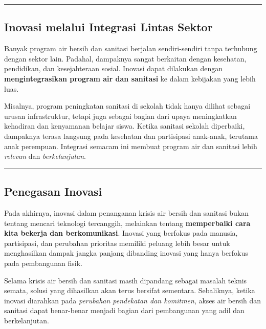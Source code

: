 \documentclass[
  letterpaper,
  DIV=11,
  numbers=noendperiod]{scrreprt}
\begin{document}
\begin{center}\rule{0.5\linewidth}{0.5pt}\end{center}

\subsection{Inovasi melalui Integrasi Lintas
Sektor}\label{inovasi-melalui-integrasi-lintas-sektor}

Banyak program air bersih dan sanitasi berjalan sendiri-sendiri tanpa
terhubung dengan sektor lain. Padahal, dampaknya sangat berkaitan dengan
kesehatan, pendidikan, dan kesejahteraan sosial. Inovasi dapat dilakukan
dengan \textbf{mengintegrasikan program air dan sanitasi} ke dalam
kebijakan yang lebih luas.

Misalnya, program peningkatan sanitasi di sekolah tidak hanya dilihat
sebagai urusan infrastruktur, tetapi juga sebagai bagian dari upaya
meningkatkan kehadiran dan kenyamanan belajar siswa. Ketika sanitasi
sekolah diperbaiki, dampaknya terasa langsung pada kesehatan dan
partisipasi anak-anak, terutama anak perempuan. Integrasi semacam ini
membuat program air dan sanitasi lebih \emph{relevan} dan
\emph{berkelanjutan}.

\begin{center}\rule{0.5\linewidth}{0.5pt}\end{center}

\subsection{Penegasan Inovasi}\label{penegasan-inovasi}

Pada akhirnya, inovasi dalam penanganan krisis air bersih dan sanitasi
bukan tentang mencari teknologi tercanggih, melainkan tentang
\textbf{memperbaiki cara kita bekerja dan berkomunikasi}. Inovasi yang
berfokus pada manusia, partisipasi, dan perubahan prioritas memiliki
peluang lebih besar untuk menghasilkan dampak jangka panjang dibanding
inovasi yang hanya berfokus pada pembangunan fisik.

Selama krisis air bersih dan sanitasi masih dipandang sebagai masalah
teknis semata, solusi yang dihasilkan akan terus bersifat sementara.
Sebaliknya, ketika inovasi diarahkan pada \emph{perubahan pendekatan dan
komitmen}, akses air bersih dan sanitasi dapat benar-benar menjadi
bagian dari pembangunan yang adil dan berkelanjutan.

\end{document}
